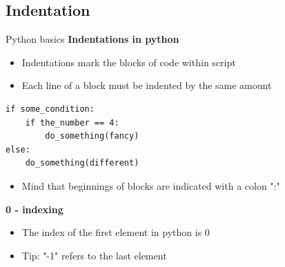 \documentclass[xcolor=x11names, compress,handout]{beamer}
\renewcommand{\(}{\begin{columns}}
\renewcommand{\)}{\end{columns}}
\newcommand{\<}[1]{\begin{column}{#1}}
\renewcommand{\>}{\end{column}}
\begin{document}
\subsection{Indentation}
\begin{frame}[fragile]{Python basics}
\textbf{Indentations in python}
\begin{itemize}
\item Indentations mark the blocks of code within script 
\item Each line of a block must be indented by the same amount
\end{itemize}

\begin{verbatim}
if some_condition:
    if the_number == 4:
        do_something(fancy)
else:
    do_something(different)
\end{verbatim}

\begin{itemize}
\item Mind that beginnings of blocks are indicated with a colon ":"
\end{itemize}

\textbf{0 - indexing}
\begin{itemize}
\item The index of the first element in python is 0
\item Tip: "-1" refers to the last element 
\end{itemize}
\end{frame}


  
\end{document}
